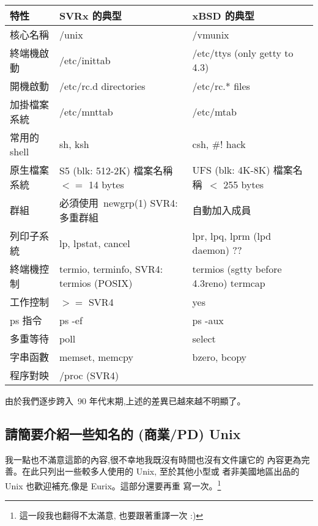 \documentclass{article}
\begin{document}
\begin{CJK*}{Bg5}{ming}
{\footnotesize
\begin{tabular}{|l|p{3.5cm}|p{4cm}|}
\hline
      特性          &   SVRx 的典型           & xBSD 的典型 \\
\hline 
      核心名稱      &   /unix                 & /vmunix \\
      終端機啟動    &   /etc/inittab          & /etc/ttys (only getty to 4.3) \\
      開機啟動      &   /etc/rc.d directories & /etc/rc.* files \\
      加掛檔案系統  &   /etc/mnttab           & /etc/mtab \\
      常用的shell   &   sh, ksh               & csh, \#! hack \\
      原生檔案系統  &   S5 (blk: 512-2K) \newline
                        檔案名稱~$<=$ 14 bytes & UFS (blk: 4K-8K) \newline
						 檔案名稱~$<$ 255 bytes \\
      群組          &   必須使用~newgrp(1) \newline
                        SVR4: 多重群組        & 自動加入成員 \\
      列印子系統    &   lp, lpstat, cancel    & lpr, lpq, lprm (lpd daemon) ?? \\
      終端機控制    &   termio, terminfo, \newline
                        SVR4: termios (POSIX) & termios (sgtty before 4.3reno) \newline
					        termcap \\
      工作控制      &   $>=$ SVR4             & yes \\
      ps 指令       &   ps -ef                & ps -aux \\
      多重等待      &   poll                  & select \\
      字串函數      &   memset, memcpy        & bzero, bcopy \\
      程序對映      &   /proc  (SVR4) & \\
\hline
\end{tabular}
\normalsize

      由於我們逐步跨入~90 年代末期,上述的差異已越來越不明顯了。

\subsection{請簡要介紹一些知名的 (商業/PD) Unix}

      我一點也不滿意這節的內容,很不幸地我既沒有時間也沒有文件讓它的
      內容更為完善。在此只列出一些較多人使用的 Unix, 至於其他小型或
      者非美國地區出品的 Unix 也歡迎補充,像是 Eurix。這部分還要再重
      寫一次。\footnote{這一段我也翻得不太滿意, 也要跟著重譯一次 :)}

}
\end{CJK*}
\end{document}
